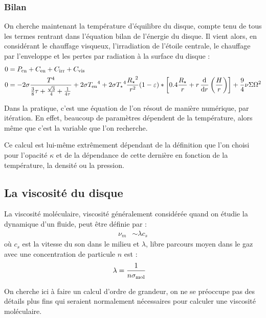 \subsubsection{Bilan}
On cherche maintenant la température d'équilibre du disque, compte tenu de tous les termes rentrant dans l'équation bilan de l'énergie du disque. Il vient alors, en considérant le chauffage visqueux, l'irradiation de l'étoile centrale, le chauffage par l'enveloppe et les pertes par radiation à la surface du disque : 
\begin{align}
0 &= P_\text{cn} + C_\text{en} + C_\text{irr} + C_\text{vis}\nonumber\\
0 &= - 2\sigma \frac{T^4}{\frac{3}{8}\tau + \frac{\sqrt{3}}{4} + \inv{4\tau}} + 2 \sigma {T_\text{en}}^4 + 2 \sigma {T_\star}^4 \frac{{R_\star}^2}{r^2} (1-\varepsilon) * \left[0.4 \frac{R_\star}{r} + r \dod{}{r}\left(\frac{H}{r}\right)\right] + \frac{9}{4} \nu\Sigma\Omega^2\label{eq:equation_energie}
\end{align}

Dans la pratique, c'est une équation de l'on résout de manière numérique, par itération. En effet, beaucoup de paramètres dépendent de la température, alors même que c'est la variable que l'on recherche. 

Ce calcul est lui-même extrêmement dépendant de la définition que l'on choisi pour l'opacité $\kappa$ et de la dépendance de cette dernière en fonction de la température, la densité ou la pression. 

\subsection{La viscosité du disque}\label{sec:viscosite}%
La viscosité moléculaire, viscosité généralement considérée quand on étudie la dynamique d'un fluide, peut être définie par : 
\begin{align}
\nu_m &\sim \lambda c_s
\end{align}
où $c_s$ est la vitesse du son dans le milieu et $\lambda$, libre parcours moyen dans le gaz avec une concentration de particule $n$ est :
\begin{align}
\lambda &= \frac{1}{n\sigma_\text{mol}}
\end{align}

On cherche ici à faire un calcul d'ordre de grandeur, on ne se préoccupe pas des détails plus fins qui seraient normalement nécessaires pour calculer une viscosité moléculaire. 

